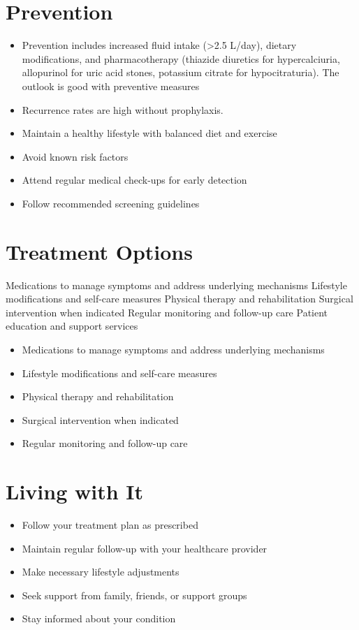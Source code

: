 \section{Prevention}
\begin{itemize}[noitemsep]
  \item Prevention includes increased fluid intake (>2.5 L/day), dietary modifications, and pharmacotherapy (thiazide diuretics for hypercalciuria, allopurinol for uric acid stones, potassium citrate for hypocitraturia). The outlook is good with preventive measures
  \item Recurrence rates are high without prophylaxis.
  \item Maintain a healthy lifestyle with balanced diet and exercise
  \item Avoid known risk factors
  \item Attend regular medical check-ups for early detection
  \item Follow recommended screening guidelines
\end{itemize}
\section{Treatment Options}
Medications to manage symptoms and address underlying mechanisms Lifestyle modifications and self-care measures Physical therapy and rehabilitation Surgical intervention when indicated Regular monitoring and follow-up care Patient education and support services

\begin{itemize}[noitemsep]
  \item Medications to manage symptoms and address underlying mechanisms
  \item Lifestyle modifications and self-care measures
  \item Physical therapy and rehabilitation
  \item Surgical intervention when indicated
  \item Regular monitoring and follow-up care
\end{itemize}
\section{Living with It}
\begin{itemize}[noitemsep]
  \item Follow your treatment plan as prescribed
  \item Maintain regular follow-up with your healthcare provider
  \item Make necessary lifestyle adjustments
  \item Seek support from family, friends, or support groups
  \item Stay informed about your condition
\end{itemize}
